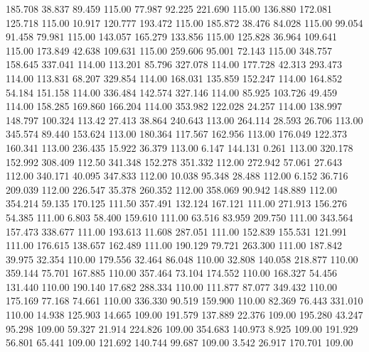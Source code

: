  185.708   38.837   89.459       115.00
  77.987   92.225  221.690       115.00
 136.880  172.081  125.718       115.00
  10.917  120.777  193.472       115.00
 185.872   38.476   84.028       115.00
  99.054   91.458   79.981       115.00
 143.057  165.279  133.856       115.00
 125.828   36.964  109.641       115.00
 173.849   42.638  109.631       115.00
 259.606   95.001   72.143       115.00
 348.757  158.645  337.041       114.00
 113.201   85.796  327.078       114.00
 177.728   42.313  293.473       114.00
 113.831   68.207  329.854       114.00
 168.031  135.859  152.247       114.00
 164.852   54.184  151.158       114.00
 336.484  142.574  327.146       114.00
  85.925  103.726   49.459       114.00
 158.285  169.860  166.204       114.00
 353.982  122.028   24.257       114.00
 138.997  148.797  100.324       113.42
  27.413   38.864  240.643       113.00
 264.114   28.593   26.706       113.00
 345.574   89.440  153.624       113.00
 180.364  117.567  162.956       113.00
 176.049  122.373  160.341       113.00
 236.435   15.922   36.379       113.00
   6.147  144.131    0.261       113.00
 320.178  152.992  308.409       112.50
 341.348  152.278  351.332       112.00
 272.942   57.061   27.643       112.00
 340.171   40.095  347.833       112.00
  10.038   95.348   28.488       112.00
   6.152   36.716  209.039       112.00
 226.547   35.378  260.352       112.00
 358.069   90.942  148.889       112.00
 354.214   59.135  170.125       111.50
 357.491  132.124  167.121       111.00
 271.913  156.276   54.385       111.00
   6.803   58.400  159.610       111.00
  63.516   83.959  209.750       111.00
 343.564  157.473  338.677       111.00
 193.613   11.608  287.051       111.00
 152.839  155.531  121.991       111.00
 176.615  138.657  162.489       111.00
 190.129   79.721  263.300       111.00
 187.842   39.975   32.354       110.00
 179.556   32.464   86.048       110.00
  32.808  140.058  218.877       110.00
 359.144   75.701  167.885       110.00
 357.464   73.104  174.552       110.00
 168.327   54.456  131.440       110.00
 190.140   17.682  288.334       110.00
 111.877   87.077  349.432       110.00
 175.169   77.168   74.661       110.00
 336.330   90.519  159.900       110.00
  82.369   76.443  331.010       110.00
  14.938  125.903   14.665       109.00
 191.579  137.889   22.376       109.00
 195.280   43.247   95.298       109.00
  59.327   21.914  224.826       109.00
 354.683  140.973    8.925       109.00
 191.929   56.801   65.441       109.00
 121.692  140.744   99.687       109.00
   3.542   26.917  170.701       109.00
